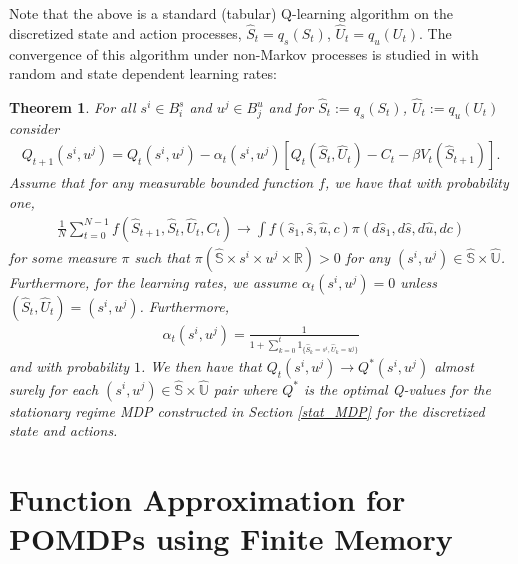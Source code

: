 \documentclass[11pt]{article}
\newtheorem{theorem}{Theorem}
\begin{document}
Note that the above is a standard (tabular) Q-learning algorithm on the discretized state and action processes, $\hat{S}_t=q_s(S_t)$, $\hat{U}_t=q_u(U_t)$. The convergence of this algorithm under non-Markov processes is studied in \cite{kara2024qlearning} with random and state dependent learning rates:
\begin{theorem}
For all $s^i \in B_i^s$ and $u^j \in B_j^u$ and for $\hat{S}_t:=q_s(S_t)$, $\hat{U}_t:=q_u(U_t)$ consider
\begin{align*}
Q_{t+1}(s^i,u^j) = Q_t(s^i,u^j) - \alpha_t(s^i,u^j) \left[ Q_t(\hat{S}_t,\hat{U}_t) - C_t - \beta V_t(\hat{S}_{t+1}) \right].
\end{align*}
Assume that for any measurable bounded function $f$, we have that with probability one,
\begin{align*}
\frac{1}{N}\sum_{t=0}^{N-1} f(\hat{S}_{t+1},\hat{S}_t,\hat{U}_t,C_t)\to \int f(\hat{s}_1,\hat{s},\hat{u},c)\pi(d\hat{s}_1,d\hat{s},d\hat{u},dc)
\end{align*}
for some measure $\pi$ such that $\pi(\mathbb{\hat{S}}\times {s^i}\times {u^j}\times\mathbb{R})>0$ for any $(s^i,u^j)\in \mathbb{\hat{S}}\times \mathbb{\hat{U}}$. Furthermore, for the learning rates, we assume  $\alpha_t(s^i,u^j)=0$ unless $(\hat{S}_t,\hat{U}_t)=(s^i,u^j)$. Furthermore,
\begin{align*}
\alpha_t(s^i,u^j)=\frac{1}{1+\sum_{k=0}^t1_{\{\hat{S}_k=s^i,\hat{U}_k=u^j\}}}
\end{align*}
and with probability $1$. We then have that $Q_t(s^i,u^j)\to Q^*(s^i,u^j)$ almost surely for each $(s^i,u^j)\in\mathbb{\hat{S}}\times\mathbb{\hat{U}}$ pair where $Q^*$ is the optimal Q-values for the stationary regime MDP constructed in Section \ref{stat_MDP} for the discretized state and actions.
\end{theorem}



\section{Function Approximation for POMDPs using Finite Memory}\label{pomdp_section}
\end{document}

